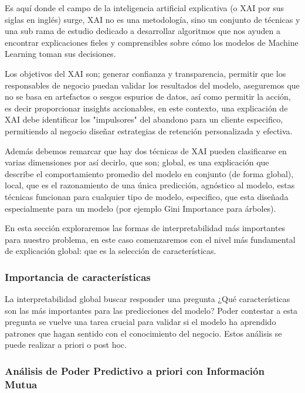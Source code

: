 Es aquí donde el campo de la inteligencia artificial explicativa (o XAI por sus siglas en inglés) surge, XAI no es una metodología, sino un conjunto de técnicas y una sub rama  de estudio dedicado a desarrollar algoritmos que nos ayuden a encontrar explicaciones fieles y comprensibles sobre cómo los modelos de Machine Learning toman sus decisiones. 

Los objetivos del XAI son; generar confianza y transparencia, permitir que los responsables de negocio puedan validar los resultados del modelo, aseguremos que no se basa en artefactos o sesgos espurios de datos, así como permitir la acción, es decir proporcionar insights accionables, en este contexto, una explicación de XAI debe identificar los "impulsores" del abandono para un cliente especifico, permitiendo al negocio diseñar estrategias de retención personalizada y efectiva.

Además debemos remarcar que hay dos técnicas de XAI pueden clasificarse en varias dimensiones por así decirlo, que son; global, es una explicación que describe el comportamiento promedio del modelo en conjunto (de forma global), local, que es el razonamiento de una única predicción, agnóstico al modelo, estas técnicas funcionan para cualquier tipo de modelo, especifico, que esta diseñada especialmente para un modelo (por ejemplo Gini Importance para árboles).

En esta sección exploraremos las formas de interpretabilidad más importantes para nuestro problema, en este caso comenzaremos con el nivel más fundamental de explicación global: que es la selección de características.



\subsubsection{Importancia de características}

La interpretabilidad global buscar responder una pregunta ¿Qué características son las más importantes para las predicciones del modelo? Poder contestar a esta pregunta se vuelve una tarea crucial para validar si el modelo ha aprendido patrones que hagan sentido con el conocimiento del negocio. Estos análisis se puede realizar a priori o post hoc.  

\subsubsection[Importancia de características]{Análisis de Poder Predictivo a priori con Información Mutua}

